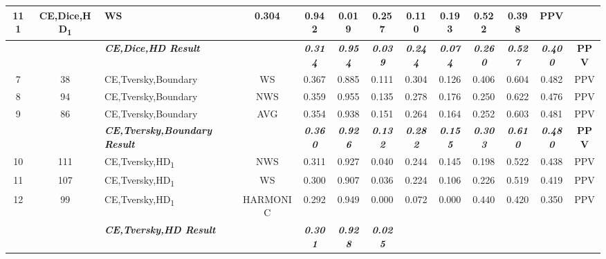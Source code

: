 \begin{table}[H]
{\begin{tabular}{cc|l|c|c|c|c|c|c|c|c|c|c|}
    111 &
    CE,Dice,HD\textsubscript{1} &
    WS &
    0.304 &
    0.942 &
    0.019 &
    0.257 &
    0.110 &
    0.193 &
    0.522 &
    0.398 &
    PPV \\ \hline
  \textbf{} &
    \textit{\textbf{}} &
    \textit{\textbf{CE,Dice,HD Result}} &
    \textbf{} &
    \textit{\textbf{0.314}} &
    \textit{\textbf{0.954}} &
    \textit{\textbf{0.039}} &
    \textit{\textbf{0.244}} &
    \textit{\textbf{0.074}} &
    \textit{\textbf{0.260}} &
    \textit{\textbf{0.527}} &
    \textit{\textbf{0.400}} &
    \textbf{PPV} \\ \hline
  \multicolumn{1}{|c|}{7} &
    38 &
    CE,Tversky,Boundary &
    WS &
    0.367 &
    0.885 &
    0.111 &
    0.304 &
    0.126 &
    0.406 &
    0.604 &
    0.482 &
    PPV \\ \hline
  \multicolumn{1}{|c|}{8} &
    94 &
    CE,Tversky,Boundary &
    NWS &
    0.359 &
    0.955 &
    0.135 &
    0.278 &
    0.176 &
    0.250 &
    0.622 &
    0.476 &
    PPV \\ \hline
  \multicolumn{1}{|c|}{9} &
    86 &
    CE,Tversky,Boundary &
    AVG &
    0.354 &
    0.938 &
    0.151 &
    0.264 &
    0.164 &
    0.252 &
    0.603 &
    0.481 &
    PPV \\ \hline
  \textbf{} &
    \textit{\textbf{}} &
    \textit{\textbf{CE,Tversky,Boundary Result}} &
    \textbf{} &
    \textit{\textbf{0.360}} &
    \textit{\textbf{0.926}} &
    \textit{\textbf{0.132}} &
    \textit{\textbf{0.282}} &
    \textit{\textbf{0.155}} &
    \textit{\textbf{0.303}} &
    \textit{\textbf{0.610}} &
    \textit{\textbf{0.480}} &
    \textbf{PPV} \\ \hline
  \multicolumn{1}{|c|}{10} &
    111 &
    CE,Tversky,HD\textsubscript{1} &
    NWS &
    0.311 &
    0.927 &
    0.040 &
    0.244 &
    0.145 &
    0.198 &
    0.522 &
    0.438 &
    PPV \\ \hline
  \multicolumn{1}{|c|}{11} &
    107 &
    CE,Tversky,HD\textsubscript{1} &
    WS &
    0.300 &
    0.907 &
    0.036 &
    0.224 &
    0.106 &
    0.226 &
    0.519 &
    0.419 &
    PPV \\ \hline
  \multicolumn{1}{|c|}{12} &
    99 &
    CE,Tversky,HD\textsubscript{1} &
    HARMONIC &
    0.292 &
    0.949 &
    0.000 &
    0.072 &
    0.000 &
    0.440 &
    0.420 &
    0.350 &
    PPV \\ \hline
  \textbf{} &
    \textit{\textbf{}} &
    \textit{\textbf{CE,Tversky,HD Result}} &
    \textbf{} &
    \textit{\textbf{0.301}} &
    \textit{\textbf{0.928}} &
    \textit{\textbf{0.025}} &

\end{tabular}}
\end{table}
